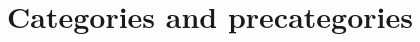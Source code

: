 \documentclass[hott-all.tex]{subfiles}
\begin{document}
%
%
%
%

\section{Categories and precategories}
\end{document}
